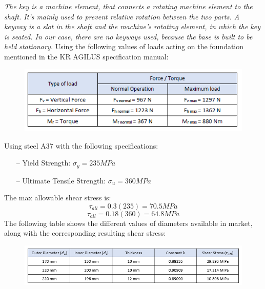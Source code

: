 \textit{The key is a machine element, that connects a rotating machine element to the shaft. It’s mainly used to prevent relative rotation between the two parts. A keyway is a slot in the shaft and the machine’s rotating element, in which the key is seated. In our case, there are no keyways used, because the base is built to be held stationary.}
\vspace{0.3 cm}
\newline Using the following values of loads acting on the foundation mentioned in the KR AGILUS specification manual:
\begin{figure}[H]
\begin{center}
	\includegraphics[scale = 0.95]{Loads}
\end{center}	
\end{figure}

Using steel A37 with the following specifications:
\begin{itemize}
	\item[--] Yield Strength: $\sigma_{y} = 235 MPa$
	\item[--] Ultimate Tensile Strength: $\sigma_{u} = 360 MPa$
\end{itemize}

The max allowable shear stress is:
$$ \tau_{all} = 0.3 (235) = 70.5 MPa $$
$$ \tau_{all} = 0.18 (360) = 64.8 MPa $$
\vspace{0.3 cm}
\newline The following table shows the different values of diameters available in market, along with the corresponding resulting shear stress:
\begin{figure}[H]
	\begin{center}
		\includegraphics[scale = 0.95]{CalculationsResults}
	\end{center}	
\end{figure}

